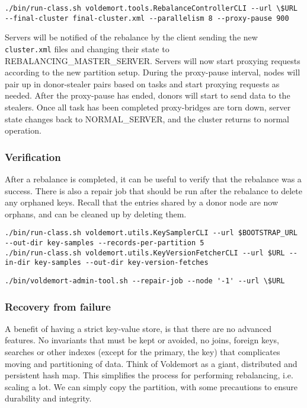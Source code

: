 \begin{lstlisting}[style=customc, caption=Sample command to execute the rebalance. Parallelism defines how many tasks can be run at the same time.]
./bin/run-class.sh voldemort.tools.RebalanceControllerCLI --url \$URL  --final-cluster final-cluster.xml --parallelism 8 --proxy-pause 900
\end{lstlisting}

Servers will be notified of the rebalance by the client sending the new \texttt{cluster.xml} files and changing their state to REBALANCING\_MASTER\_SERVER. Servers will now start proxying requests according to the new partition setup. During the proxy-pause interval, nodes will pair up in donor-stealer pairs based on tasks and start proxying requests as needed. After the proxy-pause has ended, donors will start to send data to the stealers. Once all task has been completed proxy-bridges are torn down, server state changes back to NORMAL\_SERVER, and the cluster returns to normal operation.

\subsubsection{Verification}
After a rebalance is completed, it can be useful to verify that the rebalance was a success. There is also a repair job that should be run after the rebalance to delete any orphaned keys. Recall that the entries shared by a donor node are now orphans, and can be cleaned up by deleting them.

\begin{lstlisting}[style=customc, caption=Commands for pulling a key sample from a store and the versioned data objects stored under the keys. These are used to verify that the rebalance did not corrupt data]
./bin/run-class.sh voldemort.utils.KeySamplerCLI --url $BOOTSTRAP_URL --out-dir key-samples --records-per-partition 5
./bin/run-class.sh voldemort.utils.KeyVersionFetcherCLI --url $URL --in-dir key-samples --out-dir key-version-fetches
\end{lstlisting}

\begin{lstlisting}[style=customc, caption=Sample repair job script. Passing -1 as node will run the script on all nodes.]
./bin/voldemort-admin-tool.sh --repair-job --node '-1' --url \$URL
\end{lstlisting}

\subsubsection{Recovery from failure}
A benefit of having a strict key-value store, is that there are no advanced features. No invariants that must be kept or avoided, no joins, foreign keys, searches or other indexes (except for the primary, the key) that complicates moving and partitioning of data. 
Think of Voldemort as a giant, distributed and persistent hash map.
This simplifies the process for performing rebalancing, i.e. scaling a lot. We can simply copy the partition, with some precautions to ensure durability and integrity.


